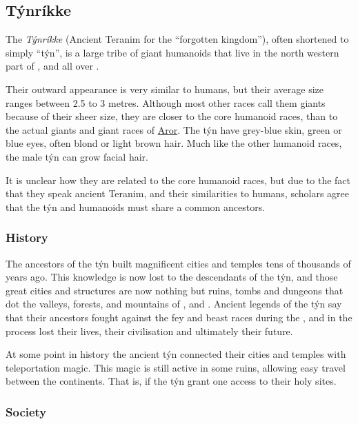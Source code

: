 \subsection{Týnríkke}
\label{sec:Tynrikke}

The \emph{Týnríkke} (Ancient Teranim for the ``forgotten kingdom''), often
shortened to simply ``týn'', is a large tribe of giant humanoids that live in
the north western part of , and all over
.

Their outward appearance is very similar to humans, but their average size
ranges between 2.5 to 3 metres. Although most other races call them giants
because of their sheer size, they are closer to the core humanoid races, than
to the actual giants and giant races of \hyperref[sec:Aror]{Aror}. The týn
have grey-blue skin, green or blue eyes, often blond or light brown hair.
Much like the other humanoid races, the male týn can grow facial hair.

It is unclear how they are related to the core humanoid races, but due to the
fact that they speak ancient Teranim, and their similarities to humans,
scholars agree that the týn and humanoids must share a common ancestors.

\subsubsection{History}

The ancestors of the týn built magnificent cities and temples tens of thousands
of years ago. This knowledge is now lost to the descendants of the týn, and
those great cities and structures are now nothing but ruins, tombs and dungeons
that dot the valleys, forests, and mountains of ,
 and . Ancient legends of the týn
say that their ancestors fought against the fey and beast races during the
, and in the process lost their lives, their
civilisation and ultimately their future.

At some point in history the ancient týn connected their cities and temples
with teleportation magic. This magic is still active in some ruins, allowing
easy travel between the continents. That is, if the týn grant one access to
their holy sites.

\subsubsection{Society}

